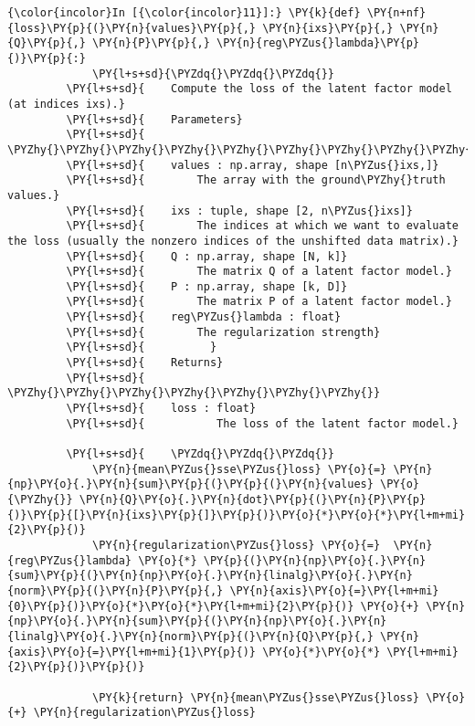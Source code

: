     \begin{Verbatim}[commandchars=\\\{\}]
{\color{incolor}In [{\color{incolor}11}]:} \PY{k}{def} \PY{n+nf}{loss}\PY{p}{(}\PY{n}{values}\PY{p}{,} \PY{n}{ixs}\PY{p}{,} \PY{n}{Q}\PY{p}{,} \PY{n}{P}\PY{p}{,} \PY{n}{reg\PYZus{}lambda}\PY{p}{)}\PY{p}{:}
             \PY{l+s+sd}{\PYZdq{}\PYZdq{}\PYZdq{}}
         \PY{l+s+sd}{    Compute the loss of the latent factor model (at indices ixs).}
         \PY{l+s+sd}{    Parameters}
         \PY{l+s+sd}{    \PYZhy{}\PYZhy{}\PYZhy{}\PYZhy{}\PYZhy{}\PYZhy{}\PYZhy{}\PYZhy{}\PYZhy{}\PYZhy{}}
         \PY{l+s+sd}{    values : np.array, shape [n\PYZus{}ixs,]}
         \PY{l+s+sd}{        The array with the ground\PYZhy{}truth values.}
         \PY{l+s+sd}{    ixs : tuple, shape [2, n\PYZus{}ixs]}
         \PY{l+s+sd}{        The indices at which we want to evaluate the loss (usually the nonzero indices of the unshifted data matrix).}
         \PY{l+s+sd}{    Q : np.array, shape [N, k]}
         \PY{l+s+sd}{        The matrix Q of a latent factor model.}
         \PY{l+s+sd}{    P : np.array, shape [k, D]}
         \PY{l+s+sd}{        The matrix P of a latent factor model.}
         \PY{l+s+sd}{    reg\PYZus{}lambda : float}
         \PY{l+s+sd}{        The regularization strength}
         \PY{l+s+sd}{          }
         \PY{l+s+sd}{    Returns}
         \PY{l+s+sd}{    \PYZhy{}\PYZhy{}\PYZhy{}\PYZhy{}\PYZhy{}\PYZhy{}\PYZhy{}}
         \PY{l+s+sd}{    loss : float}
         \PY{l+s+sd}{           The loss of the latent factor model.}
         
         \PY{l+s+sd}{    \PYZdq{}\PYZdq{}\PYZdq{}}
             \PY{n}{mean\PYZus{}sse\PYZus{}loss} \PY{o}{=} \PY{n}{np}\PY{o}{.}\PY{n}{sum}\PY{p}{(}\PY{p}{(}\PY{n}{values} \PY{o}{\PYZhy{}} \PY{n}{Q}\PY{o}{.}\PY{n}{dot}\PY{p}{(}\PY{n}{P}\PY{p}{)}\PY{p}{[}\PY{n}{ixs}\PY{p}{]}\PY{p}{)}\PY{o}{*}\PY{o}{*}\PY{l+m+mi}{2}\PY{p}{)}
             \PY{n}{regularization\PYZus{}loss} \PY{o}{=}  \PY{n}{reg\PYZus{}lambda} \PY{o}{*} \PY{p}{(}\PY{n}{np}\PY{o}{.}\PY{n}{sum}\PY{p}{(}\PY{n}{np}\PY{o}{.}\PY{n}{linalg}\PY{o}{.}\PY{n}{norm}\PY{p}{(}\PY{n}{P}\PY{p}{,} \PY{n}{axis}\PY{o}{=}\PY{l+m+mi}{0}\PY{p}{)}\PY{o}{*}\PY{o}{*}\PY{l+m+mi}{2}\PY{p}{)} \PY{o}{+} \PY{n}{np}\PY{o}{.}\PY{n}{sum}\PY{p}{(}\PY{n}{np}\PY{o}{.}\PY{n}{linalg}\PY{o}{.}\PY{n}{norm}\PY{p}{(}\PY{n}{Q}\PY{p}{,} \PY{n}{axis}\PY{o}{=}\PY{l+m+mi}{1}\PY{p}{)} \PY{o}{*}\PY{o}{*} \PY{l+m+mi}{2}\PY{p}{)}\PY{p}{)}
             
             \PY{k}{return} \PY{n}{mean\PYZus{}sse\PYZus{}loss} \PY{o}{+} \PY{n}{regularization\PYZus{}loss}
\end{Verbatim}

